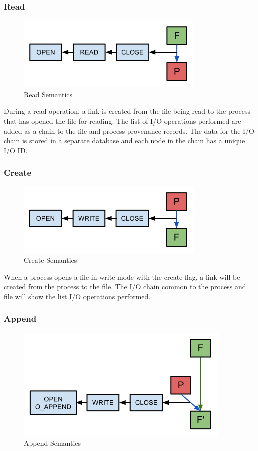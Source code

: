\subsubsection{Read}
\begin{figure}[H]
\centering
\includegraphics[scale=0.5]{res/sem/R.png}
\caption{Read Semantics}
\label{fig:rsem}
\end{figure}

During a read operation, a link is created from the file being read to the process that has opened the file for reading. The list of I/O operations performed are added as a chain to the file and process provenance records. The data for the I/O chain is stored in a separate database and each node in the chain has a unique I/O ID.

\subsubsection{Create}
\begin{figure}[H]
\centering
\includegraphics[scale=0.5]{res/sem/W.png}
\caption{Create Semantics}
\label{fig:wsem}
\end{figure}

When a process opens a file in write mode with the create flag, a link will be created from the process to the file. The I/O chain common to the process and file will show the list I/O operations performed.

\subsubsection{Append}
\begin{figure}[H]
\centering
\includegraphics[scale=0.5]{res/sem/A.png}
\caption{Append Semantics}
\label{fig:asem}
\end{figure}

